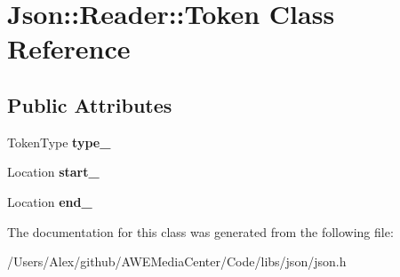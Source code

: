 \hypertarget{class_json_1_1_reader_1_1_token}{\section{Json\-:\-:Reader\-:\-:Token Class Reference}
\label{class_json_1_1_reader_1_1_token}
}
\subsection*{Public Attributes}
\begin{DoxyCompactItemize}
\item 
\hypertarget{class_json_1_1_reader_1_1_token_aa0f06d0105ec3d8cb42427c66b991bad}{Token\-Type {\bfseries type\-\_\-}}\label{class_json_1_1_reader_1_1_token_aa0f06d0105ec3d8cb42427c66b991bad}

\item 
\hypertarget{class_json_1_1_reader_1_1_token_aff87d677b9ac4b52542a00b0d6673249}{Location {\bfseries start\-\_\-}}\label{class_json_1_1_reader_1_1_token_aff87d677b9ac4b52542a00b0d6673249}

\item 
\hypertarget{class_json_1_1_reader_1_1_token_a7d3bc0fa40097f435d184be4b1fd5ae1}{Location {\bfseries end\-\_\-}}\label{class_json_1_1_reader_1_1_token_a7d3bc0fa40097f435d184be4b1fd5ae1}

\end{DoxyCompactItemize}


The documentation for this class was generated from the following file\-:\begin{DoxyCompactItemize}
\item 
/\-Users/\-Alex/github/\-A\-W\-E\-Media\-Center/\-Code/libs/json/json.\-h\end{DoxyCompactItemize}
